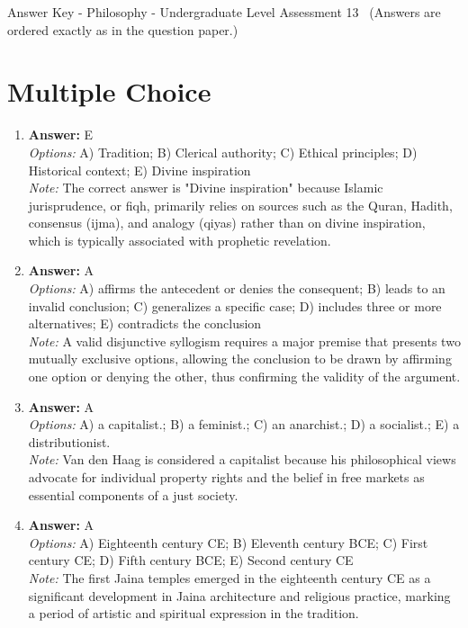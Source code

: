 \documentclass[12pt]{article}
\begin{document}
\begin{center}
Answer Key - Philosophy - Undergraduate Level Assessment 13 \
\small (Answers are ordered exactly as in the question paper.)
\end{center}

\section*{Multiple Choice}
\begin{enumerate}[label=\arabic*.]
\item \textbf{Answer:} E
\\ \textit{Options:} A) Tradition; B) Clerical authority; C) Ethical principles; D) Historical context; E) Divine inspiration
\\ \textit{Note:} The correct answer is "Divine inspiration" because Islamic jurisprudence, or fiqh, primarily relies on sources such as the Quran, Hadith, consensus (ijma), and analogy (qiyas) rather than on divine inspiration, which is typically associated with prophetic revelation.
\item \textbf{Answer:} A
\\ \textit{Options:} A) affirms the antecedent or denies the consequent; B) leads to an invalid conclusion; C) generalizes a specific case; D) includes three or more alternatives; E) contradicts the conclusion
\\ \textit{Note:} A valid disjunctive syllogism requires a major premise that presents two mutually exclusive options, allowing the conclusion to be drawn by affirming one option or denying the other, thus confirming the validity of the argument.
\item \textbf{Answer:} A
\\ \textit{Options:} A) a capitalist.; B) a feminist.; C) an anarchist.; D) a socialist.; E) a distributionist.
\\ \textit{Note:} Van den Haag is considered a capitalist because his philosophical views advocate for individual property rights and the belief in free markets as essential components of a just society.
\item \textbf{Answer:} A
\\ \textit{Options:} A) Eighteenth century CE; B) Eleventh century BCE; C) First century CE; D) Fifth century BCE; E) Second century CE
\\ \textit{Note:} The first Jaina temples emerged in the eighteenth century CE as a significant development in Jaina architecture and religious practice, marking a period of artistic and spiritual expression in the tradition.

\end{enumerate}
\end{document}
